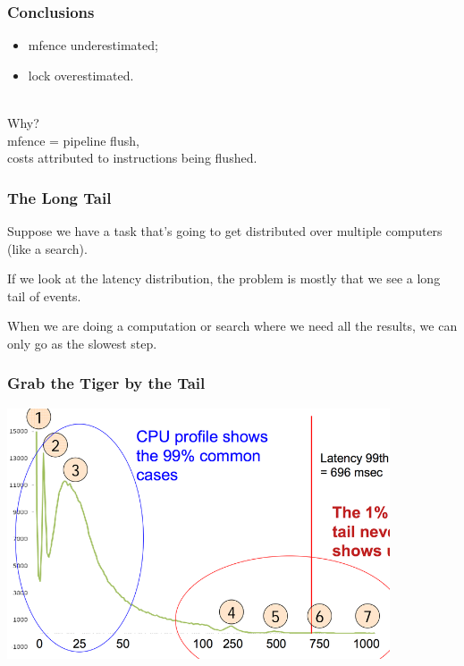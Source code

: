 \begin{frame}
  \frametitle{Conclusions}

  
    \begin{itemize}
    \item mfence underestimated;
      \item lock overestimated.
    \end{itemize}
    ~\\
    Why? \\[1em]
    mfence = pipeline flush,\\
    costs attributed to instructions being flushed.\\
  

\end{frame}




\begin{frame}
\frametitle{The Long Tail}

Suppose we have a task that's going to get distributed over multiple computers (like a search). 

If we look at the latency distribution, the problem is mostly that we see a long tail of events. 

When we are doing a computation or search where we need all the results, we can only go as the slowest step.

\end{frame}



\begin{frame}
\frametitle{Grab the Tiger by the Tail}

\begin{center}
	\includegraphics[width=0.85\textwidth]{images/disk_tail.png}
\end{center}

\end{frame}



